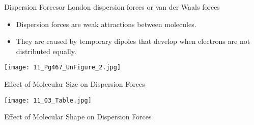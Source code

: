 \documentclass[notes=hide]{beamer}
\begin{document}
\begin{frame}{Dispersion Forces}{or London dispersion forces or van der Waals
	forces}
	\begin{itemize}
		\item Dispersion forces are \alert{weak} attractions between
			molecules.
		\item They are caused by \alert{temporary dipoles} that develop
			when electrons are not distributed equally.
	\end{itemize}

	\bigskip

	\begin{overlayarea}{\linewidth}{12em}
		\begin{center}
			{\texttt{[image: 11\_Pg467\_UnFigure\_2.jpg]}}
		\end{center}
	\end{overlayarea}
\end{frame}

\begin{frame}{Effect of Molecular Size on Dispersion Forces}
	\begin{center}
		\texttt{[image: 11\_03\_Table.jpg]}
	\end{center}
\end{frame}



\begin{frame}{Effect of Molecular Shape on Dispersion Forces}

\end{frame}

\end{document}
